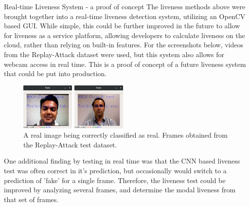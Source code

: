 \documentclass[final]{beamer}
\begin{document}
\begin{frame}{}
\begin{columns}[t]
\begin{column}{.48\linewidth}
     


        \begin{block}{Real-time Liveness System - a proof of concept}
          The liveness methods above were brought together into a real-time liveness detection system, utilizing an OpenCV based GUI.
          While simple, this could be further improved in the future to allow for liveness as a service platform, allowing developers to calculate liveness on the cloud,
          rather than relying on built-in features. For the screenshots below, videos from the Replay-Attack dataset were used, but this system also allows for webcam access in real time.
          This is a proof of concept of a future liveness system that could be put into production.

          \begin{figure}[!tbp]
            \centering
            \begin{minipage}[b]{0.3\textwidth}
              \centering
              \includegraphics[width=100px]{FakeOutputAndCorrect.png}
              \caption{A spoofed image being correctly classified as fake by both liveness tests. Frames obtained from the Replay-Attack test dataset.}
            \end{minipage}
            \begin{minipage}[b]{0.3\textwidth}
              \centering
              \includegraphics[width=100px]{BothRealAndCorrect.png}
            \caption{A real image being correctly classified as real. Frames obtained from the Replay-Attack test dataset.}
            \end{minipage}
          \end{figure}
          
          One additional finding by testing in real time was that the CNN based liveness test was often correct in it's prediction, but occasionally would
          switch to a prediction of 'fake' for a single frame. Therefore, the liveness test could be improved by analyzing several frames, and determine the modal liveness from that set of frames.
          

\end{block}
\end{column}
\end{columns}
\end{frame}
\end{document}
